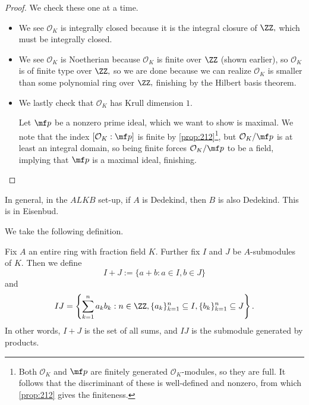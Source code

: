 \documentclass[../notes.tex]{subfiles}
\begin{document}
\begin{proof}
    We check these one at a time.
    \begin{itemize}
        \item We see $\mathcal O_K$ is integrally closed because it is the integral closure of $\ZZ,$ which must be integrally closed.
        \item We see $\mathcal O_K$ is Noetherian because $\mathcal O_K$ is finite over $\ZZ$ (shown earlier), so $\mathcal O_K$ is of finite type over $\ZZ,$ so we are done because we can realize $\mathcal O_K$ is smaller than some polynomial ring over $\ZZ,$ finishing by the Hilbert basis theorem.
        \item We lastly check that $\mathcal O_K$ has Krull dimension $1.$
        
        Let $\mf p$ be a nonzero prime ideal, which we want to show is maximal.
        We note that the index $[\mathcal O_K:\mf p]$ is finite by \autoref{prop:212}\footnote{Both $\mathcal O_K$ and $\mf p$ are finitely generated $\mathcal O_K$-modules, so they are full. It follows that the discriminant of these is well-defined and nonzero, from which \autoref{prop:212} gives the finiteness.}, but $\mathcal O_K/\mf p$ is at least an integral domain, so being finite forces $\mathcal O_K/\mf p$ to be a field, implying that $\mf p$ is a maximal ideal, finishing.
        \qedhere
    \end{itemize}
\end{proof}
\begin{remark}
    In general, in the $ALKB$ set-up, if $A$ is Dedekind, then $B$ is also Dedekind. This is in Eisenbud.
\end{remark}
We take the following definition.
\begin{defi}
    Fix $A$ an entire ring with fraction field $K.$ Further fix $I$ and $J$ be $A$-submodules of $K.$ Then we define
    \[I+J:=\{a+b:a\in I,b\in J\}\]
    and
    \[IJ=\left\{\sum_{k=1}^na_kb_k:n\in\ZZ,\{a_k\}_{k=1}^n\subseteq I,\{b_k\}_{k=1}^n\subseteq J\right\}.\]
    In other words, $I+J$ is the set of all sums, and $IJ$ is the submodule generated by products.
\end{defi}
\end{document}
